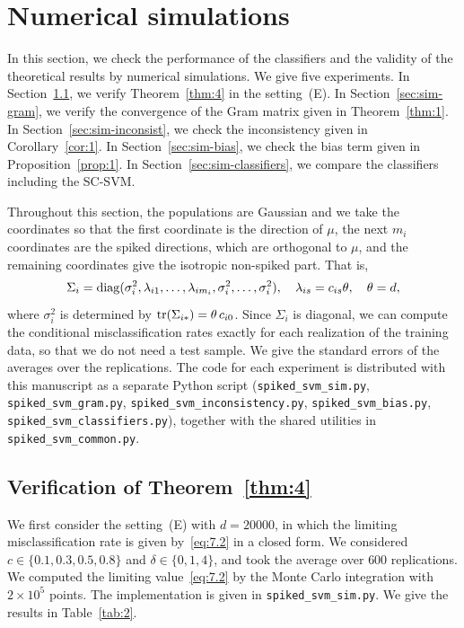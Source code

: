 \section{Numerical simulations}
\label{sec:sim}

In this section, we check the performance of the classifiers and the validity of
the theoretical results by numerical simulations. We give five experiments. In
Section~\ref{sec:sim-thm4}, we verify Theorem~\ref{thm:4} in the setting~(E). In
Section~\ref{sec:sim-gram}, we verify the convergence of the Gram matrix given in
Theorem~\ref{thm:1}. In Section~\ref{sec:sim-inconsist}, we check the inconsistency
given in Corollary~\ref{cor:1}. In Section~\ref{sec:sim-bias}, we check the bias
term given in Proposition~\ref{prop:1}. In Section~\ref{sec:sim-classifiers}, we
compare the classifiers including the SC-SVM.

Throughout this section, the populations are Gaussian and we take the coordinates
so that the first coordinate is the direction of $\mu$, the next $m_i$ coordinates
are the spiked directions, which are orthogonal to $\mu$, and the remaining
coordinates give the isotropic non-spiked part. That is,
\begin{equation}
\Sigma_i=\operatorname{diag}(\sigma_i^2,\lambda_{i1},\dots,\lambda_{im_i},\sigma_i^2,\dots,\sigma_i^2),
\quad
\lambda_{is}=c_{is}\theta,
\quad
\theta=d,
\label{eq:11.1}
\end{equation}
where $\sigma_i^2$ is determined by $\operatorname{tr}(\Sigma_{i*})=\theta\,c_{i0}$. Since
$\Sigma_i$ is diagonal, we can compute the conditional misclassification rates
exactly for each realization of the training data, so that we do not need a test
sample. We give the standard errors of the averages over the replications.
The code for each experiment is distributed with this manuscript as a separate
Python script (\texttt{spiked\_svm\_sim.py}, \texttt{spiked\_svm\_gram.py},
\texttt{spiked\_svm\_inconsistency.py}, \texttt{spiked\_svm\_bias.py},
\texttt{spiked\_svm\_classifiers.py}), together with the shared utilities in
\texttt{spiked\_svm\_common.py}.

\subsection{Verification of Theorem~\ref{thm:4}}
\label{sec:sim-thm4}

We first consider the setting~(E) with $d=20000$, in which the limiting
misclassification rate is given by~\eqref{eq:7.2} in a closed form. We considered
$c\in\{0.1,0.3,0.5,0.8\}$ and $\delta\in\{0,1,4\}$, and took the average over
$600$ replications. We computed the limiting value~\eqref{eq:7.2} by the Monte
Carlo integration with $2\times 10^5$ points. The implementation is given in
\texttt{spiked\_svm\_sim.py}. We give the results in
Table~\ref{tab:2}.

